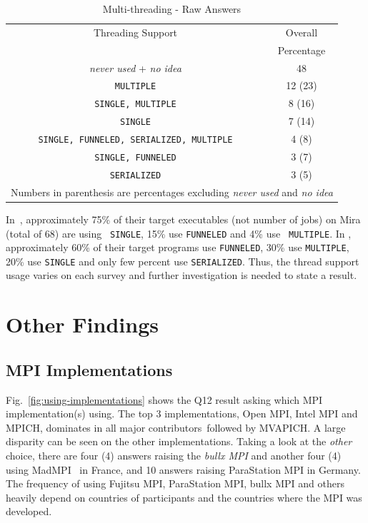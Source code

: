 \documentclass[preprint,5p,times]{elsarticle}
\def\myquote#1{{\it #1}}
\def\mcountries{major contributors\xspace{}}%
\begin{document}
\begin{table}[htb]%
  \begin{center}%
    \caption{Multi-threading - Raw Answers}\label{tab:multi-thread-raw}%
    \begin{tabular}{c|c}%
      \hline%
      Threading Support & Overall \\
      & Percentage \\
      \hline%
      \myquote{never used} + \myquote{no idea} & 48 \\
              {\tt MULTIPLE} & 12 (23) \\
              {\tt SINGLE, MULTIPLE} & 8 (16) \\
              {\tt SINGLE} & 7 (14) \\
              {\small\tt SINGLE, FUNNELED, SERIALIZED, MULTIPLE} & 4 (8) \\
              {\tt SINGLE, FUNNELED} & 3 (7) \\
              {\tt SERIALIZED} & 3 (5) \\
              \hline%
              \multicolumn{2}{c}{\footnotesize Numbers in parenthesis are
                percentages excluding \myquote{never used} and \myquote{no
                  idea}}
    \end{tabular}%
  \end{center}%
\end{table}%

In~\cite{8665758}, approximately 75\% of their target
executables (not number of jobs) on Mira (total of 68) are using {\tt
  SINGLE}, 15\% use {\tt FUNNELED} and 4\% use {\tt
  MULTIPLE}. In \cite{10.1145/3295500.3356176}, approximately 60\% of
their target programs use {\tt FUNNELED}, 30\% use {\tt MULTIPLE}, 20\%
use {\tt SINGLE} and only few percent use {\tt SERIALIZED}. Thus, the
thread support usage varies on each survey and further investigation
is needed to state a result.

\section{Other Findings}

\subsection{MPI Implementations}

  Fig.~\ref{fig:using-implementations} shows the Q12 result asking
  which MPI implementation(s) using. The top 3
  implementations, Open MPI, Intel MPI and MPICH, dominates in all
  \mcountries\  followed by MVAPICH. A large disparity can be
  seen on the other implementations. Taking a
  look at the \myquote{other} choice, there are four (4) answers raising the
  \myquote{bullx MPI} and another four (4) using MadMPI~\cite{madmpi} in
  France, and 10
  answers raising ParaStation MPI in Germany. The frequency of using
  Fujitsu MPI, ParaStation MPI, bullx MPI and others heavily depend on
  countries of participants and the countries where the MPI was
  developed.
\end{document}
